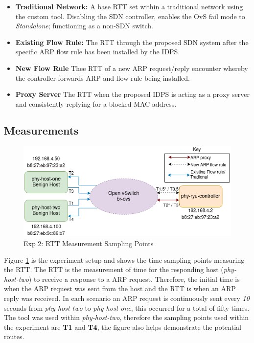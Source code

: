 \documentclass[12pt, oneside]{book}
\begin{document}
\begin{itemize}
  \itemsep0em 
  \item \textbf{Traditional Network:} A base RTT set within a traditional network using the custom tool.
          Disabling the SDN controller, enables the OvS fail mode to \emph{Standalone}; functioning as a non-SDN switch.
  \item \textbf{Existing Flow Rule:} The RTT through the proposed SDN system after the specific ARP flow rule has been installed by the IDPS.
  \item \textbf{New Flow Rule} Thee RTT of a new ARP request/reply encounter whereby the controller forwards ARP and flow rule being installed.
  \item \textbf{Proxy Server} The RTT when the proposed IDPS is acting as a proxy server and consistently replying for a blocked MAC address.
\end{itemize}


\subsection{Measurements}
\begin{figure}[H]
  \centering
  \includegraphics[scale=0.65]{../tests/RTT/diag.png}
  \caption{Exp 2: RTT Measurement Sampling Points}
  \label{fig:rttexpset}
\end{figure}

Figure \ref{fig:rttexpset} is the experiment setup and shows the time sampling points measuring the RTT. 
The RTT is the measurement of time for the responding host (\emph{phy-host-two}) to receive a response to
a ARP request. Therefore, the initial time is when the ARP request was sent from the host and the RTT is when
an ARP reply was received. In each scenario an ARP request is continuously sent every \emph{10} seconds from \emph{phy-host-two}
to \emph{phy-host-one}, this occurred for a total of fifty times.
The tool was used within \emph{phy-host-two},
therefore the sampling points used within the experiment are \textbf{T1} and \textbf{T4}, the figure also helps demonstrate the potential
routes.
\end{document}
